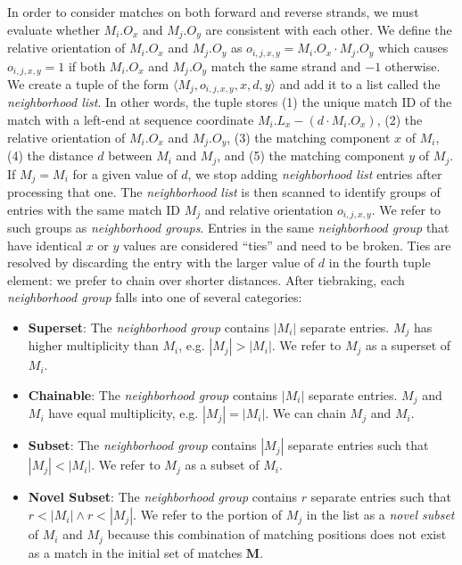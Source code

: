 \documentclass{llncs}
\begin{document}
In order to consider matches on both forward and reverse strands, we
must evaluate whether $M_i.O_x$ and $M_j.O_y$ are consistent with
each other.  We define the relative orientation of $M_i.O_x$ and
$M_j.O_y$ as $o_{i,j,x,y} = M_i.O_x \cdot M_j.O_y$ which causes
$o_{i,j,x,y} = 1$ if both $M_i.O_x$ and $M_j.O_y$ match the same
strand and $-1$ otherwise. We create a tuple of the form $\langle
M_j, o_{i,j,x,y}, x, d, y \rangle$ and add it to a list called the
\textit{neighborhood list}. In other words, the tuple stores (1) the
unique match ID of the match with a left-end at sequence coordinate
$M_i.L_x-(d \cdot M_i.O_x)$, (2) the relative orientation of
$M_i.O_x$ and $M_j.O_y$, (3) the matching component $x$ of $M_i$,
(4) the distance $d$ between $M_i$ and $M_j$, and (5) the matching
component $y$ of $M_j$. If $M_j=M_i$ for a given value of $d$, we
stop adding \textit{neighborhood list} entries after processing that
one. The \textit{neighborhood list} is then scanned to identify
groups of entries with the same match ID $M_j$ and relative
orientation $o_{i,j,x,y}$. We refer to such groups as
\textit{neighborhood groups}.  Entries in the same
\textit{neighborhood group} that have identical $x$ or $y$ values
are considered ``ties'' and need to be broken. Ties are resolved by
discarding the entry with the larger value of $d$ in the fourth
tuple element: we prefer to chain over shorter distances. After
tiebraking, each \textit{neighborhood group} falls into one of
several categories:

\begin{itemize}
\itemsep 0pt

\item\textbf{Superset}: The \textit{neighborhood group} contains
$|M_i|$ separate entries. $M_j$ has higher multiplicity than
$M_i$, e.g. $|M_j|>|M_i|$.  We refer to $M_j$ as a superset of
$M_i$. \item \textbf{Chainable}: The \textit{neighborhood group}
contains $|M_i|$ separate entries. $M_j$ and $M_i$ have equal
multiplicity, e.g. $|M_j|=|M_i|$.  We can chain $M_j$ and $M_i$.
\item \textbf{Subset}:  The \textit{neighborhood group} contains
$|M_j|$ separate entries such that $|M_j| < |M_i|$.  We refer to
$M_j$ as a subset of $M_i$. \item \textbf{Novel Subset}:  The
\textit{neighborhood group} contains $r$ separate entries such
that $r < |M_i| \wedge r < |M_j|$.  We refer to the portion of
$M_j$ in the list as a \textit{novel subset} of $M_i$ and $M_j$
because this combination of matching positions does not exist as a
match in the initial set of matches $\mathbf{M}$.
\end{itemize}
\end{document}
